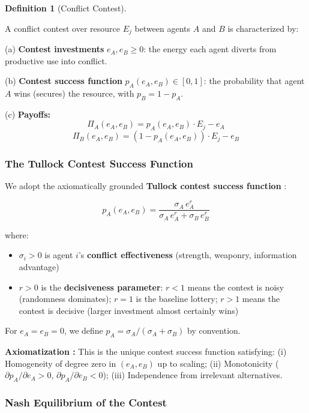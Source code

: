 \documentclass[11pt]{article}
\theoremstyle{plain}
\theoremstyle{definition}
\newtheorem{definition}{Definition}
\theoremstyle{remark}
\let\origsubsubsection\subsubsection
\renewcommand{\subsubsection}{\needspace{4\baselineskip}\origsubsubsection}
\providecommand{\tightlist}{%
  \setlength{\itemsep}{0pt}\setlength{\parskip}{0pt}}
\begin{document}
\begin{definition}[Conflict Contest]
\label{def-conflict-contest}

A conflict contest over resource $E_j$ between agents $A$ and $B$ is characterized by:

(a) \textbf{Contest investments} $e_A, e_B \geq 0$: the energy each agent diverts from productive use into conflict.

(b) \textbf{Contest success function} $p_A(e_A, e_B) \in [0, 1]$: the probability that agent $A$ wins (secures) the resource, with $p_B = 1 - p_A$.

(c) \textbf{Payoffs:}
$$\Pi_A(e_A, e_B) = p_A(e_A, e_B) \cdot E_j - e_A$$
$$\Pi_B(e_A, e_B) = (1 - p_A(e_A, e_B)) \cdot E_j - e_B$$
\end{definition}

\subsubsection{The Tullock Contest Success
Function}\label{the-tullock-contest-success-function}

We adopt the axiomatically grounded \textbf{Tullock contest success
function} \citep{Skaperdas1996}:

\[p_A(e_A, e_B) = \frac{\sigma_A \, e_A^r}{\sigma_A \, e_A^r + \sigma_B \, e_B^r}\]

where:

\begin{itemize}
\tightlist
\item
  \(\sigma_i > 0\) is agent \(i\)'s \textbf{conflict effectiveness}
  (strength, weaponry, information advantage)
\item
  \(r > 0\) is the \textbf{decisiveness parameter}: \(r < 1\) means the
  contest is noisy (randomness dominates); \(r = 1\) is the baseline
  lottery; \(r > 1\) means the contest is decisive (larger investment
  almost certainly wins)
\end{itemize}

For \(e_A = e_B = 0\), we define
\(p_A = \sigma_A / (\sigma_A + \sigma_B)\) by convention.

\textbf{Axiomatization \citep{Skaperdas1996}:} This is the unique
contest success function satisfying: (i) Homogeneity of degree zero in
\((e_A, e_B)\) up to scaling; (ii) Monotonicity
(\(\partial p_A / \partial e_A > 0\),
\(\partial p_A / \partial e_B < 0\)); (iii) Independence from irrelevant
alternatives.

\subsubsection{Nash Equilibrium of the
Contest}\label{nash-equilibrium-of-the-contest}
\end{document}
